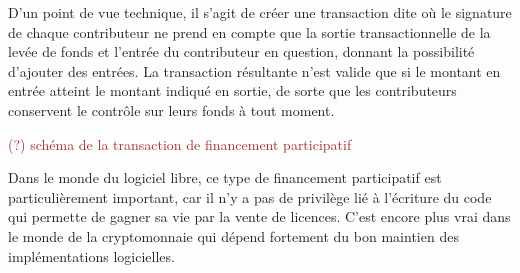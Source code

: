 D'un point de vue technique, il s'agit de créer une transaction dite  où le signature de chaque contributeur ne prend en compte que la sortie transactionnelle de la levée de fonds et l'entrée du contributeur en question, donnant la possibilité d'ajouter des entrées. La transaction résultante n'est valide que si le montant en entrée atteint le montant indiqué en sortie, de sorte que les contributeurs conservent le contrôle sur leurs fonds à tout moment.

\textcolor{brown}{(?) schéma de la transaction de financement participatif}

Dans le monde du logiciel libre, ce type de financement participatif est particulièrement important, car il n'y a pas de privilège lié à l'écriture du code qui permette de gagner sa vie par la vente de licences. C'est encore plus vrai dans le monde de la cryptomonnaie qui dépend fortement du bon maintien des implémentations logicielles.


